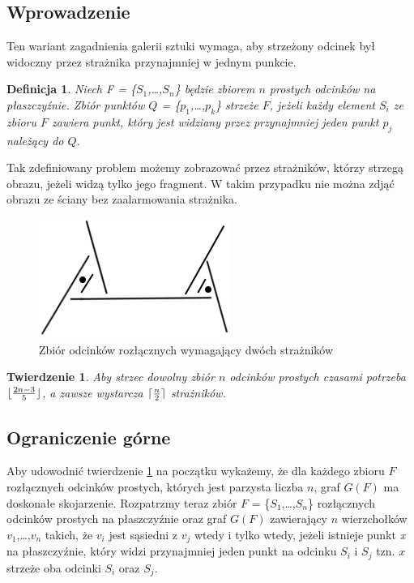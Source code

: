 \documentclass[brudnopis]{xmgr}
\DeclarePairedDelimiter\ceil{\lceil}{\rceil}
\DeclarePairedDelimiter\floor{\lfloor}{\rfloor}
\newtheorem{Twierdzenie}{Twierdzenie}
\newtheorem{Definicja}{Definicja}
\begin{document}
\subsection{Wprowadzenie}
Ten wariant zagadnienia galerii sztuki wymaga, aby strzeżony odcinek był widoczny przez strażnika przynajmniej w jednym punkcie. 
\begin{Definicja}
Niech F = \textnormal{\{}$S_1$,\ldots,$S_n$\textnormal{\}} będzie zbiorem $n$ prostych \textnormal{odcinków} na płaszczyźnie. Zbiór punktów $Q$ = \textnormal{\{}$p_1$,\ldots,$p_k$\textnormal{\}} \textnormal{strzeże} $F$, jeżeli każdy element $S_i$ ze zbioru $F$ zawiera punkt, który jest widziany przez przynajmniej jeden punkt $p_j$ należący do $Q$.
\end{Definicja}
Tak zdefiniowany problem możemy zobrazować przez strażników, którzy strzegą obrazu, jeżeli widzą tylko jego fragment. W takim przypadku nie można zdjąć obrazu ze ściany bez zaalarmowania strażnika.
\begin{figure}[ht!]
 \centering
  \includegraphics{rysunki/rozlaczny_dwoch_straznikow.png}
  \caption{Zbiór odcinków rozłącznych wymagający dwóch strażników}
\end{figure} 

\begin{Twierdzenie}\label{straznicy strzezenie}
Aby \textnormal{strzec} dowolny zbiór $n$ \textnormal{odcinków} prostych czasami potrzeba $\floor{\frac{2n-3}{5}}$, a zawsze wystarcza $\ceil{\frac{n}{2}}$ strażników.
\end{Twierdzenie}

\subsection{Ograniczenie górne}
Aby udowodnić twierdzenie \ref{straznicy strzezenie} na początku wykażemy, że dla każdego zbioru $F$ rozłącznych odcinków prostych, których jest parzysta liczba $n$, graf $G(F)$ ma doskonałe skojarzenie.
Rozpatrzmy teraz zbiór $F$ = \textnormal{\{}$S_1$,\ldots,$S_n$\textnormal{\}} rozłącznych odcinków prostych na płaszczyźnie oraz graf $G(F)$ zawierający $n$ wierzchołków $v_1$,\ldots,$v_n$ takich, że $v_i$ jest sąsiedni z $v_j$ wtedy i tylko wtedy, jeżeli istnieje punkt \textit{x} na płaszczyźnie, który widzi przynajmniej jeden punkt na odcinku $S_i$ i $S_j$ tzn. $x$ strzeże oba odcinki $S_i$ oraz $S_j$.
\end{document}
